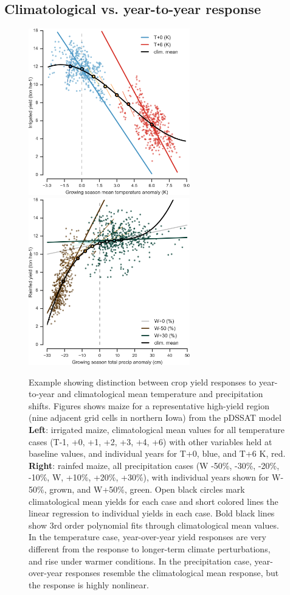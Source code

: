 \documentclass[gmd, manuscript]{copernicus} %
\begin{document}
\subsection{Climatological vs. year-to-year response}
\begin{figure}[ht]
\centering
   \includegraphics[width=7cm]{figures/tempyearvclim.png} \hspace{10mm} \includegraphics[width=7cm]{figures/pryearvclim.png}
   \caption{
   Example showing distinction between crop yield responses to year-to-year and climatological mean temperature and precipitation shifts. 
   Figures shows maize for a representative high-yield region (nine adjacent grid cells in northern Iowa) from the pDSSAT model 
   \textbf{Left}: irrigated maize, climatological mean values for all temperature cases (T-1, +0, +1, +2, +3, +4, +6) with other variables held at baseline values, and individual years for T+0, blue, and T+6 K, red. 
   \textbf{Right}: rainfed maize, all precipitation cases (W -50\%, -30\%, -20\%, -10\%, W, +10\%, +20\%, +30\%), with individual years shown for W-50\%, grown, and W+50\%, green.
   Open black circles mark climatological mean yields for each case and short colored lines the linear regression to individual yields in each case. Bold black lines show 3rd order polynomial fits through climatological mean values. 
   In the temperature case, year-over-year yield responses are very different from the response to longer-term climate perturbations, and rise under warmer conditions. In the precipitation case, year-over-year responses resemble the climatological mean response, but the response is highly nonlinear.
   }
   \label{fig:yearvclim}
\end{figure}
\end{document}
